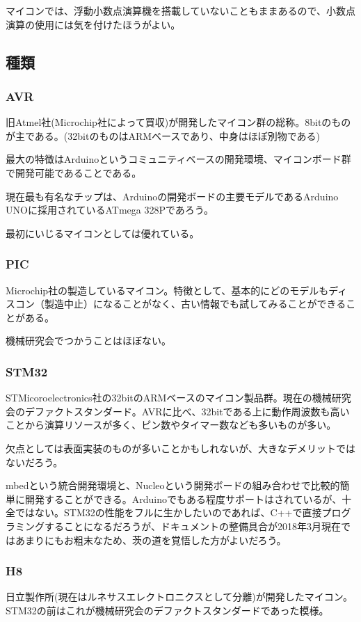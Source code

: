 \documentclass[a4paper,titlepage,here]{ujarticle}
\begin{document}
マイコンでは、浮動小数点演算機を搭載していないこともままあるので、小数点演算の使用には気を付けたほうがよい。
\subsection{種類}
\subsubsection{AVR}
旧Atmel社(Microchip社によって買収)が開発したマイコン群の総称。8bitのものが主である。(32bitのものはARMベースであり、中身はほぼ別物である)

最大の特徴はArduinoというコミュニティベースの開発環境、マイコンボード群で開発可能であることである。

現在最も有名なチップは、Arduinoの開発ボードの主要モデルであるArduino UNOに採用されているATmega 328Pであろう。

最初にいじるマイコンとしては優れている。
\subsubsection{PIC}
Microchip社の製造しているマイコン。特徴として、基本的にどのモデルもディスコン（製造中止）になることがなく、古い情報でも試してみることができることがある。

機械研究会でつかうことはほぼない。
\subsubsection{STM32}
STMicoroelectronics社の32bitのARMベースのマイコン製品群。現在の機械研究会のデファクトスタンダード。AVRに比べ、32bitである上に動作周波数も高いことから演算リソースが多く、ピン数やタイマー数なども多いものが多い。

欠点としては表面実装のものが多いことかもしれないが、大きなデメリットではないだろう。

mbedという統合開発環境と、Nucleoという開発ボードの組み合わせで比較的簡単に開発することができる。Arduinoでもある程度サポートはされているが、十全ではない。STM32の性能をフルに生かしたいのであれば、C++で直接プログラミングすることになるだろうが、ドキュメントの整備具合が2018年3月現在ではあまりにもお粗末なため、茨の道を覚悟した方がよいだろう。
\subsubsection{H8}
日立製作所(現在はルネサスエレクトロニクスとして分離)が開発したマイコン。STM32の前はこれが機械研究会のデファクトスタンダードであった模様。
\end{document}
